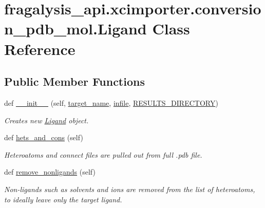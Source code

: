 \hypertarget{classfragalysis__api_1_1xcimporter_1_1conversion__pdb__mol_1_1_ligand}{}\section{fragalysis\+\_\+api.\+xcimporter.\+conversion\+\_\+pdb\+\_\+mol.\+Ligand Class Reference}
\label{classfragalysis__api_1_1xcimporter_1_1conversion__pdb__mol_1_1_ligand}
\subsection*{Public Member Functions}
\begin{DoxyCompactItemize}
\item 
def \hyperlink{classfragalysis__api_1_1xcimporter_1_1conversion__pdb__mol_1_1_ligand_a93d37150b50131f70bb890e6ec609047}{\+\_\+\+\_\+init\+\_\+\+\_\+} (self, \hyperlink{classfragalysis__api_1_1xcimporter_1_1conversion__pdb__mol_1_1_ligand_a7bacd3ad4cf07e41aed7a9f2a4ff387a}{target\+\_\+name}, \hyperlink{classfragalysis__api_1_1xcimporter_1_1conversion__pdb__mol_1_1_ligand_a32128e8047085e698f5ca00f3c5272a9}{infile}, \hyperlink{classfragalysis__api_1_1xcimporter_1_1conversion__pdb__mol_1_1_ligand_aae0e03b03bc78f6d2df7f84a6df36901}{R\+E\+S\+U\+L\+T\+S\+\_\+\+D\+I\+R\+E\+C\+T\+O\+RY})
\begin{DoxyCompactList}\small\item\em Creates new \hyperlink{classfragalysis__api_1_1xcimporter_1_1conversion__pdb__mol_1_1_ligand}{Ligand} object. \end{DoxyCompactList}\item 
def \hyperlink{classfragalysis__api_1_1xcimporter_1_1conversion__pdb__mol_1_1_ligand_af0d3d0b75f9f10f0f50cba06017c4ba6}{hets\+\_\+and\+\_\+cons} (self)
\begin{DoxyCompactList}\small\item\em Heteroatoms and connect files are pulled out from full .pdb file. \end{DoxyCompactList}\item 
def \hyperlink{classfragalysis__api_1_1xcimporter_1_1conversion__pdb__mol_1_1_ligand_af21865a4bb9be6aab21bfc82668ba25e}{remove\+\_\+nonligands} (self)
\begin{DoxyCompactList}\small\item\em Non-\/ligands such as solvents and ions are removed from the list of heteroatoms, to ideally leave only the target ligand. \end{DoxyCompactList}\item 

\end{DoxyCompactItemize}
